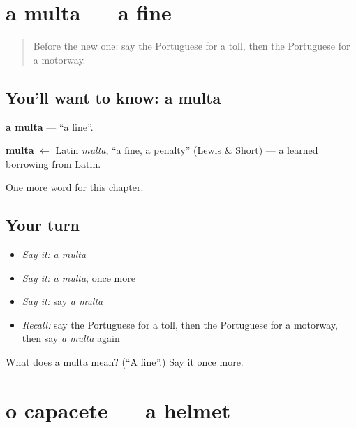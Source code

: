 \section[a multa]{a multa — a fine}

\label{lesson:PT-C249-multa}



\begin{quote}
Before the new one: say the Portuguese for a toll, then the Portuguese for a motorway.
\end{quote}

\subsection*{You'll want to know: a multa}
\textbf{a multa} — \textquotedblleft{}a fine\textquotedblright{}.

\begin{cousinweb}
\textbf{multa} $\leftarrow$ Latin \emph{multa}, \textquotedblleft{}a fine, a penalty\textquotedblright{} (Lewis \& Short) — a learned borrowing from Latin.
\end{cousinweb}

\begin{grammarlens}[title={What you've built}]
One more word for this chapter.
\end{grammarlens}

\subsection*{Your turn}
\begin{itemize}
\raggedright
  \item \emph{Say it:} \emph{a multa}
  \item \emph{Say it:} \emph{a multa}, once more
  \item \emph{Say it:} say \emph{a multa}
  \item \emph{Recall:} say the Portuguese for a toll, then the Portuguese for a motorway, then say \emph{a multa} again
\end{itemize}

\begin{tcolorbox}[breakable,colback=teal!4,colframe=teal!35!black,title={Before you move on}]
What does a multa mean? (\textquotedblleft{}A fine\textquotedblright{}.) Say it once more.
\end{tcolorbox}
\section[o capacete]{o capacete — a helmet}

